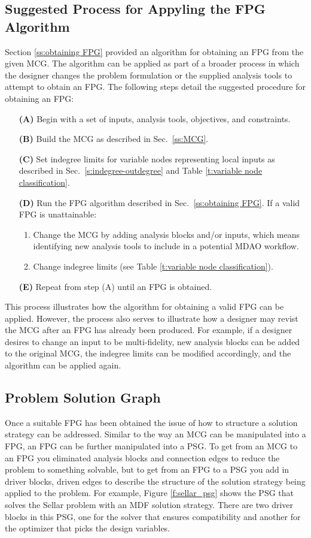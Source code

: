 \subsection{Suggested Process for Appyling the FPG Algorithm}
\label{ss:process}
Section \ref{ss:obtaining FPG} provided an algorithm for obtaining an FPG from the given MCG. 
The algorithm can be applied as part of a broader process in which the designer changes the problem formulation or the supplied analysis tools to attempt to obtain an FPG. The following steps detail the suggested procedure for obtaining an FPG:
\begin{enumerate}
\item[\bf{(A)}] Begin with a set of inputs, analysis tools, objectives, and constraints.
\item[\bf{(B)}] Build the MCG as described in Sec.~\ref{ss:MCG}.
\item[\bf{(C)}] Set indegree limits for variable nodes representing local inputs as described in Sec.~\ref{s:indegree-outdegree} and Table \ref{t:variable node classification}.
\item[\bf{(D)}] Run the FPG algorithm described in Sec.~\ref{ss:obtaining FPG}. If a valid FPG is unattainable:
		\begin{enumerate}
\item Change the MCG by adding analysis blocks and/or inputs, which means identifying new analysis tools to include in a potential MDAO workflow.
\item Change indegree limits (see Table \ref{t:variable node classification}).
\end{enumerate}
\item[\bf{(E)}] Repeat from step (A) until an FPG is obtained.
\end{enumerate}
This process illustrates how the algorithm for obtaining a valid FPG can be applied. However, the process also serves to illustrate how a designer may revist the MCG after an FPG has already been produced. For example, if a designer desires to change an input to be multi-fidelity, new analysis blocks can be added to the original MCG, the indegree limits can be modified accordingly, and the algorithm can be applied again.



\subsection{Problem Solution Graph}
Once a suitable FPG has been obtained the issue of how to structure a solution strategy 
can be addressed. Similar to the way an MCG can be manipulated into a FPG, an FPG can be
further manipulated into a PSG. To get from an MCG to an FPG you eliminated analysis blocks and
connection edges to reduce the problem to something solvable, but to get from an FPG to a PSG you 
add in driver blocks, driven edges to describe the structure of the solution strategy being applied 
to the problem. For example, Figure \ref{f:sellar_psg} shows the PSG that solves the Sellar problem 
with an MDF solution strategy. There are two driver blocks in this PSG, one for the solver that 
ensures compatibility and another for the optimizer that picks the design variables. 

